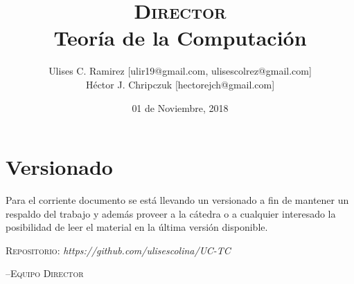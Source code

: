 \documentclass{report}
\title{\textsc{Director}\\Teoría de la Computación}
\author{Ulises C. Ramirez [ulir19@gmail.com, ulisescolrez@gmail.com]\\Héctor J.
Chripczuk [hectorejch@gmail.com]}
\date{01 de Noviembre, 2018}
\begin{document}
\maketitle
{}
\newpage
\section*{Versionado}
Para el corriente documento se est\'a llevando un versionado a fin de mantener
un respaldo del trabajo y adem\'as proveer a la c\'atedra o a cualquier
interesado la posibilidad de leer el material en la \'ultima versi\'on disponible.\\

\begin{center}
  \textsc{Repositorio}: \textit{https://github.com/ulisescolina/UC-TC}
\end{center}

\hfill--\textsc{Equipo Director}
\tableofcontents
\lstlistoflistings
{}
\newpage






\newpage
\printbibliography[title={Referencias}]
\end{document}
